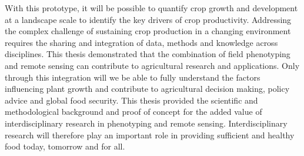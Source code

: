 With this prototype, it will be possible to quantify crop growth and development at a landscape scale to identify the key drivers of crop productivity. Addressing the complex challenge of sustaining crop production in a changing environment requires the sharing and integration of data, methods and knowledge across disciplines. This thesis demonstrated that the combination of field phenotyping and remote sensing can contribute to agricultural research and applications. Only through this integration will we be able to fully understand the factors influencing plant growth and contribute to agricultural decision making, policy advice and global food security. This thesis provided the scientific and methodological background and proof of concept for the added value of interdisciplinary research in phenotyping and remote sensing. Interdisciplinary research will therefore play an important role in providing sufficient and healthy food today, tomorrow and for all.